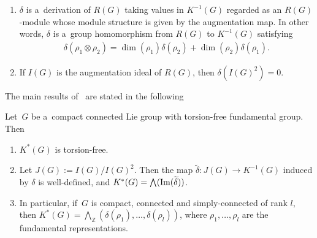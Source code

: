 \begin{Proposition}[\cite{Ho}]\label{noneqderivation}\quad
\begin{enumerate}\itemsep=0pt
\item[$1.$]
$\delta$ is a~derivation of $R(G)$ taking values in $K^{-1}(G)$ regarded as an $R(G)$-module whose module structure is
given by the augmentation map.
In other words, $\delta$ is a~group homomorphism from $R(G)$ to $K^{-1}(G)$ satisfying
\begin{gather}
\label{leibniz}
\delta(\rho_1\otimes\rho_2)=\dim(\rho_1)\delta(\rho_2)+\dim(\rho_2)\delta(\rho_1).
\end{gather}
\item[$2.$]
If $I(G)$ is the augmentation ideal of $R(G)$, then $\delta(I(G)^2)=0$.
\end{enumerate}
\end{Proposition}

The main results of~\cite{Ho} are stated in the following
\begin{Theorem}
\label{hodgkin}
Let~$G$ be a~compact connected Lie group with torsion-free fundamental group.
Then
\begin{enumerate}\itemsep=0pt
\item[$1.$]
$K^*(G)$ is torsion-free.
\item[$2.$]
Let $J(G):=I(G)/I(G)^2$.
Then the map $\widetilde{\delta}: J(G)\to K^{-1}(G)$ induced by $\delta$ is well-defined, and
$K^*(G)=\bigwedge(\text{\rm Im}(\widetilde{\delta}))$.
\item[$3.$]
In particular, if~$G$ is compact, connected and simply-connected of rank $l$, then
$K^*(G)=\bigwedge_{\mathbb{Z}}(\delta(\rho_1), \dots, \delta(\rho_l))$, where $\rho_1, \dots, \rho_l$ are the
fundamental representations.
\end{enumerate}
\end{Theorem}

